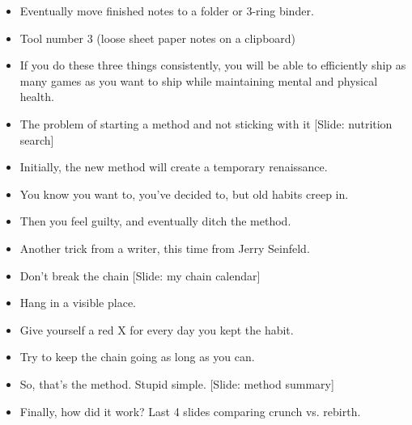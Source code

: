 \documentclass[12pt]{article}
\begin{document}
{\begin{itemize}
\item Eventually move finished notes to a folder or 3-ring binder.

\item Tool number 3 (loose sheet paper notes on a clipboard)





\item If you do these three things consistently, you will be able to efficiently ship as many games as you want to ship while maintaining mental and physical health.

\item The problem of starting a method and not sticking with it [Slide: nutrition search]

\item Initially, the new method will create a temporary renaissance.

\item You know you want to, you've decided to, but old habits creep in.

\item Then you feel guilty, and eventually ditch the method.

\item Another trick from a writer, this time from Jerry Seinfeld.

\item Don't break the chain [Slide: my chain calendar]

\item Hang in a visible place.

\item Give yourself a red X for every day you kept the habit.

\item Try to keep the chain going as long as you can.

\item So, that's the method.  Stupid simple.  [Slide: method summary]

\item Finally, how did it work?  Last 4 slides comparing crunch vs. rebirth.



\end{itemize}

}
\end{document}

